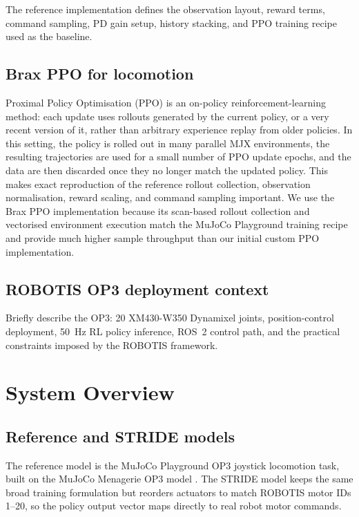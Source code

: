 The reference implementation defines the observation layout, reward terms, command sampling, PD gain setup, history stacking, and PPO training recipe used as the baseline.

\subsection{Brax PPO for locomotion}

Proximal Policy Optimisation (PPO) is an on-policy reinforcement-learning method: each update uses rollouts generated by the current policy, or a very recent version of it, rather than arbitrary experience replay from older policies. In this setting, the policy is rolled out in many parallel MJX environments, the resulting trajectories are used for a small number of PPO update epochs, and the data are then discarded once they no longer match the updated policy. This makes exact reproduction of the reference rollout collection, observation normalisation, reward scaling, and command sampling important. We use the Brax PPO implementation because its scan-based rollout collection and vectorised environment execution match the MuJoCo Playground training recipe and provide much higher sample throughput than our initial custom PPO implementation.

\subsection{ROBOTIS OP3 deployment context}

Briefly describe the OP3: 20 XM430-W350 Dynamixel joints, position-control deployment, 50~Hz RL policy inference, ROS~2 control path, and the practical constraints imposed by the ROBOTIS framework.

\section{System Overview}
\label{sec:system}

\subsection{Reference and STRIDE models}

The reference model is the MuJoCo Playground OP3 joystick locomotion task, built on the MuJoCo Menagerie OP3 model \citep{Zakka2022-mujoco-menagerie-collection-high-quality-simulation-models,Zakka2025-demonstrating-mujoco-playground,GoogleDeepMind2025-mujoco-playground-gpu-accelerated-robot-learning-sim-to-real-transfer}. The STRIDE model keeps the same broad training formulation but reorders actuators to match ROBOTIS motor IDs 1--20, so the policy output vector maps directly to real robot motor commands.

